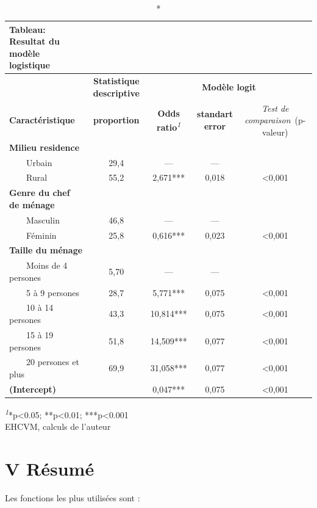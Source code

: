 \documentclass[
]{article}
\begin{document}
\setlength{\LTpost}{0mm}
\begin{longtable}{lcccc}
\caption*{
{\large \textbf{Tableau: Resultat du modèle logistique}}
} \\ 
\toprule
 & \textbf{Statistique
descriptive} & \multicolumn{3}{c}{\textbf{Modèle logit}} \\ 
\cmidrule(lr){2-2} \cmidrule(lr){3-5}
\textbf{Caractéristique} & \textbf{proportion} & \textbf{Odds
ratio}\textsuperscript{\textit{1}} & \textbf{standart error} & \emph{Test de comparaison}~(p-valeur) \\ 
\midrule\addlinespace[2.5pt]
\textbf{Milieu residence} &  &  &  &  \\ 
    Urbain & 29,4 & — & — &  \\ 
    Rural & 55,2 & 2,671*** & 0,018 & <0,001 \\ 
\textbf{Genre du chef de ménage} &  &  &  &  \\ 
    Masculin & 46,8 & — & — &  \\ 
    Féminin & 25,8 & 0,616*** & 0,023 & <0,001 \\ 
\textbf{Taille du ménage} &  &  &  &  \\ 
    Moins de 4 persones & 5,70 & — & — &  \\ 
    5 à 9 persones & 28,7 & 5,771*** & 0,075 & <0,001 \\ 
    10 à 14 persones & 43,3 & 10,814*** & 0,075 & <0,001 \\ 
    15 à 19 persones & 51,8 & 14,509*** & 0,077 & <0,001 \\ 
    20 persones et plus & 69,9 & 31,058*** & 0,077 & <0,001 \\ 
\textbf{(Intercept)} &  & 0,047*** & 0,075 & <0,001 \\ 
\bottomrule
\end{longtable}
\begin{minipage}{\linewidth}
\textsuperscript{\textit{1}}*p\textless{}0.05; **p\textless{}0.01; ***p\textless{}0.001\\
EHCVM, calculs de l'auteur\\
\end{minipage}

\newpage

\hypertarget{v-ruxe9sumuxe9}{%
\section{V Résumé}\label{v-ruxe9sumuxe9}}

Les fonctions les plus utilisées sont :
\end{document}
